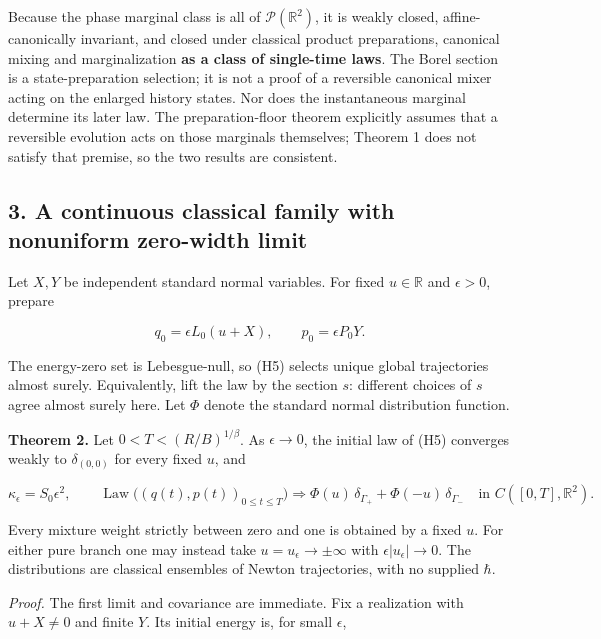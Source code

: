 \documentclass[11pt,a4paper]{article}
\begin{document}
Because the phase marginal class is all of \(\mathcal P(\mathbb R^2)\),
it is weakly closed, affine-canonically invariant, and closed under
classical product preparations, canonical mixing and marginalization
\textbf{as a class of single-time laws}. The Borel section is a
state-preparation selection; it is not a proof of a reversible canonical
mixer acting on the enlarged history states. Nor does the instantaneous
marginal determine its later law. The preparation-floor theorem
explicitly assumes that a reversible evolution acts on those marginals
themselves; Theorem 1 does not satisfy that premise, so the two results
are consistent.

\hypertarget{a-continuous-classical-family-with-nonuniform-zero-width-limit}{%
\subsection{3. A continuous classical family with nonuniform zero-width
limit}\label{a-continuous-classical-family-with-nonuniform-zero-width-limit}}

Let \(X,Y\) be independent standard normal variables. For fixed
\(u\in\mathbb R\) and \(\epsilon>0\), prepare

\[
 q_0=\epsilon L_0(u+X),\qquad p_0=\epsilon P_0Y. \tag{H5}
\]

The energy-zero set is Lebesgue-null, so (H5) selects unique global
trajectories almost surely. Equivalently, lift the law by the section
\(s\): different choices of \(s\) agree almost surely here. Let \(\Phi\)
denote the standard normal distribution function.

\textbf{Theorem 2.} Let \(0<T<(R/B)^{1/\beta}\). As \(\epsilon\to0\),
the initial law of (H5) converges weakly to \(\delta_{(0,0)}\) for every
fixed \(u\), and

\[
 \kappa_\epsilon=S_0\epsilon^2,\qquad
 \operatorname{Law}\bigl((q(t),p(t))_{0\le t\le T}\bigr)
 \Longrightarrow
 \Phi(u)\,\delta_{\Gamma_+}+\Phi(-u)\,\delta_{\Gamma_-}
 \quad\text{in }C([0,T],\mathbb R^2). \tag{H6}
\]

Every mixture weight strictly between zero and one is obtained by a
fixed \(u\). For either pure branch one may instead take
\(u=u_\epsilon\to\pm\infty\) with \(\epsilon|u_\epsilon|\to0\). The
distributions are classical ensembles of Newton trajectories, with no
supplied \(\hbar\).

\emph{Proof.} The first limit and covariance are immediate. Fix a
realization with \(u+X\ne0\) and finite \(Y\). Its initial energy is,
for small \(\epsilon\),
\end{document}
